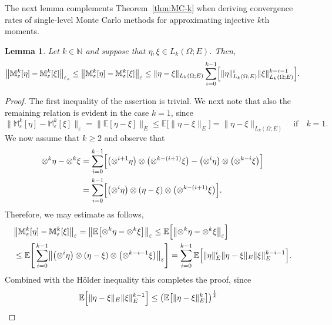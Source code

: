 \documentclass[reqno]{amsart}
\numberwithin{equation}{section}
\newcommand{\bbE}{\mathbb{E}}
\newcommand{\bbM}{\mathbb{M}}
\newcommand{\bbN}{\mathbb{N}}
\newcommand{\xk}{\otimes^k}
\newcommand{\Mk}{\bbM^k_\varepsilon}
\newcommand{\norm}[2]{     \| #1       \|_{ #2 }}
\newcommand{\eps}{\varepsilon}
\newtheorem{lemma}{Lemma}[section]
\theoremstyle{remark}
\theoremstyle{definition}
\begin{document}
The next lemma complements Theorem~\ref{thm:MC-k} 
when deriving convergence rates of   
single-level Monte Carlo methods 
for approximating injective $k$th moments. 

\begin{lemma}\label{lem:Mk-diff} 
	Let $k\in\bbN$ and 
	suppose that $\eta,\xi\in L_k(\Omega;E)$. Then, 
	\[
	\bigl\| \Mk[\eta] - \Mk[\xi] \bigr\|_{\eps_s}  
	\leq 
	\bigl\| \Mk[\eta] - \Mk[\xi] \bigr\|_{\eps} 
	\leq 
	\norm{ \eta - \xi }{L_k(\Omega;E)} 
	\sum_{i=0}^{k-1} 
	\Bigl[ 
	\norm{ \eta }{L_k(\Omega;E)}^i 
	\norm{ \xi }{L_k(\Omega;E)}^{k-i-1} 
	\Bigr] . 
	\]
\end{lemma} 

\begin{proof} 
	The first inequality of the assertion is trivial. 
	We next note that also the remaining relation 
	is evident in the case $k=1$, since  
	\[
	\bigl\| \Mk[\eta] - \Mk[\xi] \bigr\|_{\eps} 
	= 
	\bigl\| \bbE[\eta - \xi] \bigr\|_{E} 
	\leq 
	\bbE\bigl[ \norm{ \eta - \xi }{E} \bigr] 
	= 
	\norm{ \eta - \xi }{L_k(\Omega;E)} 
	\quad 
	\text{if}
	\quad  
	k=1. 
	\]
	We now assume that $k\geq 2$ and 
	observe that 
	\begin{align*} 
	{\xk} \eta 
	- 
	{\xk} \xi 
	&= 
	\sum_{i=0}^{k-1} 
	\Bigl[ \bigl( \otimes^{i+1} \eta \bigr) \otimes \bigl( \otimes^{k-(i+1)} \xi \bigr) 
	- 
	\bigl( \otimes^i \eta\bigr) \otimes \bigl( \otimes^{k-i} \xi \bigr) \Bigr]
	\\
	&= 
	\sum_{i=0}^{k-1} 
	\Bigl[ 
	\bigl( \otimes^i \eta\bigr) \otimes (\eta-\xi) 
	\otimes \bigl( \otimes^{k-(i+1)} \xi \bigr)\Bigr] . 
	\end{align*} 
	Therefore, we may estimate as follows, 
	\begin{align*} 
	&\bigl\| \Mk[\eta] - \Mk[\xi] \bigr\|_{\eps}  
	= 
	\bigl\| \bbE\bigl[ {\xk} \eta - {\xk} \xi \bigr] \bigr\|_{\eps}
	\leq 
	\bbE\Bigl[ \bigl\| {\xk} \eta - {\xk} \xi \bigr\|_{\eps} \Bigr]
	\\
	&\leq
	\bbE\Biggl[ \, 
	\sum_{i=0}^{k-1} 
	\bigl\|
	\bigl( \otimes^i \eta\bigr) \otimes (\eta-\xi) \otimes \bigl( \otimes^{k-i-1} \xi \bigr) 
	\bigr\|_{\eps} \Biggr] 
	= 
	\sum_{i=0}^{k-1} 
	\bbE\Bigl[ 
	\norm{ \eta }{E}^i \norm{ \eta -\xi }{E} \norm{ \xi }{E}^{k-i-1} 
	\Bigr]. 
	\end{align*} 
	Combined with the H\"older inequality 
	this completes the proof, 
	since 
	\begin{align*}
	\bbE\Bigl[ \norm{ \eta -\xi }{E} \norm{ \xi }{E}^{k-1} \Bigr] 
	&\leq 
	\bigl( \bbE\bigl[ \norm{ \eta -\xi }{E}^k \bigr] \bigr)^{\frac{1}{k}}  

\end{align*}
\end{proof}
\end{document}
